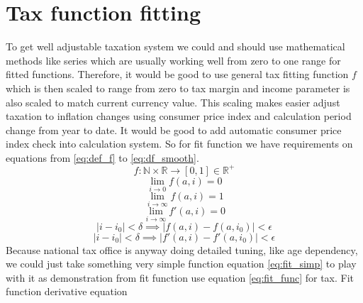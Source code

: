 \section{Tax function fitting}
\label{tax_function_fitting}
To get well adjustable taxation system we could and should use mathematical
methods like series which are usually working well from zero to one range for
fitted functions. Therefore, it would be good to use general tax fitting
function $f$ which is then scaled to range from zero to tax margin and income
parameter is also scaled to match current currency value. This scaling makes
easier adjust taxation to inflation changes using consumer price index and
calculation period change from year to date. It would be good to add automatic
consumer price index check into calculation system. So for fit function we
have requirements on equations from \ref{eq:def_f} to \ref{eq:df_smooth}.
\begin{equation} \label{eq:def_f}
 f:\mathbb{N}\times\mathbb{R} \rightarrow [0,1]\in\mathbb{R}^+
\end{equation}
\begin{equation} \label{eq:f_min}
 \lim_{i \to 0} f(a,i) = 0
\end{equation}
\begin{equation} \label{eq:f_max}
 \lim_{i \to \infty} f(a,i) = 1
\end{equation}
\begin{equation} \label{eq:df_min}
 \lim_{i \to \infty} f'(a,i)=0
\end{equation}
\begin{equation} \label{eq:f_smooth}
 |i-i_0|<\delta \implies |f(a,i)-f(a,i_0)|<\epsilon
\end{equation}
\begin{equation} \label{eq:df_smooth}
 |i-i_0|<\delta \implies |f'(a,i)-f'(a,i_0)|<\epsilon
\end{equation}
Because national tax office is anyway doing detailed tuning, like age
dependency, we could just take something very simple function equation
\ref{eq:fit_simp} to play with it as demonstration from fit function use
equation \ref{eq:fit_func} for tax. Fit function derivative equation
